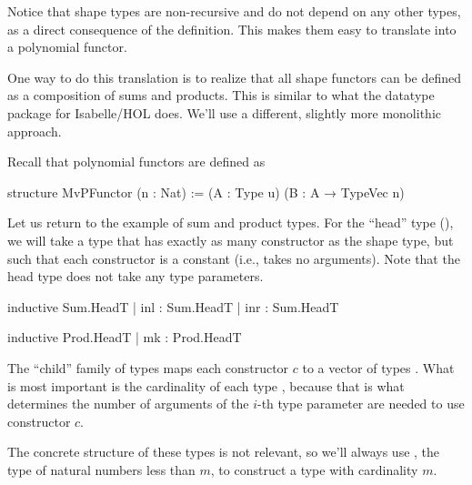 \documentclass[titlepage]{report}
\newenvironment{remark}{%
\begin{framed}
\begin{trivlist}
    \item[\hskip \labelsep {\bfseries Remark:}]}%
{%
\end{trivlist}%
\end{framed}
}
\begin{document}
Notice that shape types are non-recursive and do not depend on any other types, as a direct consequence 
of the definition. This makes them easy to translate into a polynomial functor. 

\begin{remark}
    One way to do this translation is to realize that all shape functors can be defined as a
    composition of sums and products. 
    This is similar to what the datatype package for Isabelle/HOL does.
    We'll use a different, slightly more monolithic approach.
\end{remark}

Recall that polynomial functors are defined as
\begin{leancode}
    structure MvPFunctor (n : Nat) :=
      (A : Type u) (B : A → TypeVec n)
\end{leancode}


Let us return to the example of sum and product types. 
For the ``head'' type (), we will take a type that has exactly as many constructor as
the shape type, but such that each constructor is a constant (i.e., takes no arguments).
Note that the head type does not take any type parameters. 

\begin{center}
    \begin{minipage}[t]{0.45\linewidth}
        \begin{leancode}
    inductive Sum.HeadT
      | inl : Sum.HeadT
      | inr : Sum.HeadT
        \end{leancode}
    \end{minipage}
    \begin{minipage}[t]{0.45\linewidth}
        \begin{leancode}    
    inductive Prod.HeadT
      | mk : Prod.HeadT
        \end{leancode}
    \end{minipage}
\end{center}

The ``child'' family of types maps each constructor $c$ to a vector of types .
What is most important is the cardinality of each type , 
because that is what determines the number of arguments of the $i$-th type parameter are needed
to use constructor $c$. 

The concrete structure of these types is not relevant, so we'll always use , the type
of natural numbers less than $m$, to construct a type with cardinality $m$.
\end{document}
